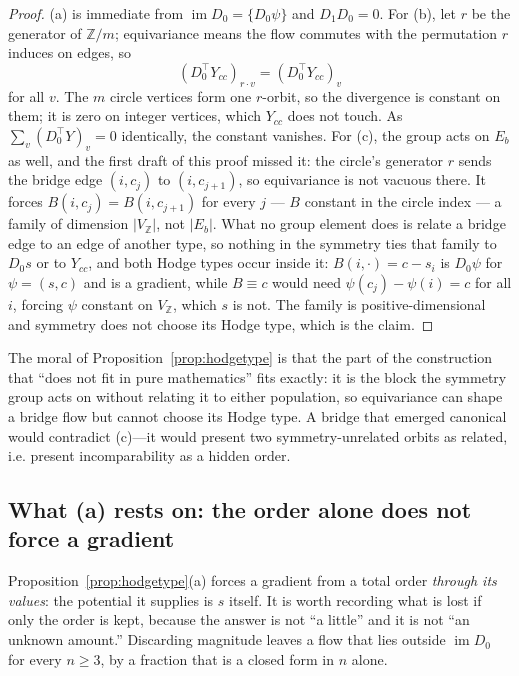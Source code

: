 \documentclass[11pt,a4paper]{article}
\theoremstyle{definition}
\theoremstyle{remark}
\newcommand{\Z}{\mathbb{Z}}
\newcommand{\im}{\operatorname{im}}
\begin{document}
\begin{proof}
(a) is immediate from $\im D_0=\{D_0\psi\}$ and $D_1D_0=0$. For (b), let $r$ be the generator of $\Z/m$; equivariance means the flow commutes with the permutation $r$ induces on edges, so
\[
(D_0^{\top}Y_{cc})_{r\cdot v}=(D_0^{\top}Y_{cc})_v
\]
for all $v$. The $m$ circle vertices form one $r$-orbit, so the divergence is constant on them; it is zero on integer vertices, which $Y_{cc}$ does not touch. As $\sum_v(D_0^{\top}Y)_v=0$ identically, the constant vanishes. For (c), the group acts on $E_b$ as well, and the first draft of this proof missed it: the circle's generator $r$ sends the bridge edge $(i,c_j)$ to $(i,c_{j+1})$, so equivariance is not vacuous there. It forces $B(i,c_j)=B(i,c_{j+1})$ for every $j$ --- $B$ constant in the circle index --- a family of dimension $|V_{\Z}|$, not $|E_b|$. What no group element does is relate a bridge edge to an edge of another type, so nothing in the symmetry ties that family to $D_0s$ or to $Y_{cc}$, and both Hodge types occur inside it: $B(i,\cdot)=c-s_i$ is $D_0\psi$ for $\psi=(s,c)$ and is a gradient, while $B\equiv c$ would need $\psi(c_j)-\psi(i)=c$ for all $i$, forcing $\psi$ constant on $V_{\Z}$, which $s$ is not. The family is positive-dimensional and symmetry does not choose its Hodge type, which is the claim.
\end{proof}

The moral of Proposition~\ref{prop:hodgetype} is that the part of the construction that ``does not fit in pure mathematics'' fits exactly: it is the block the symmetry group acts on without relating it to either population, so equivariance can shape a bridge flow but cannot choose its Hodge type. A bridge that emerged canonical would contradict (c)---it would present two symmetry-unrelated orbits as related, i.e. present incomparability as a hidden order.

\subsection{What (a) rests on: the order alone does not force a gradient}\label{subsec:sign}

Proposition~\ref{prop:hodgetype}(a) forces a gradient from a total order \emph{through its values}: the potential it supplies is $s$ itself. It is worth recording what is lost if only the order is kept, because the answer is not ``a little'' and it is not ``an unknown amount.'' Discarding magnitude leaves a flow that lies outside $\im D_0$ for every $n\ge3$, by a fraction that is a closed form in $n$ alone.
\end{document}
